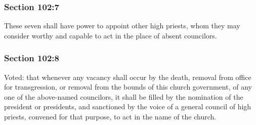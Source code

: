 
	\subsubsection{Section 102:7} %
		\label{DC102-7}

		These seven shall have power to appoint other high priests, whom they may consider worthy and capable to act in the place of absent councilors.


	\subsubsection{Section 102:8} %
		\label{DC102-8}

		Voted: that whenever any vacancy shall occur by the death, removal from office for transgression, or removal from the bounds of this church government, of any one of the above-named councilors, it shall be filled by the nomination of the president or presidents, and sanctioned by the voice of a general council of high priests, convened for that purpose, to act in the name of the church.


